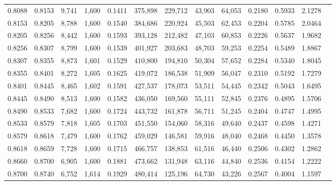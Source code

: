 \begin{tabular}{rrrrrrrrrrrrr}
0.8088 & 0.8153 &  9,741 & 1,600 &                                     0.1411 & 375,898 & 229,712 &  43,903 &  64,053 & 0.2180 & 0.5933 & 2.1278 \\
0.8153 & 0.8205 &  8,788 & 1,600 &                                     0.1540 & 384,686 & 220,924 &  45,503 &  62,453 & 0.2204 & 0.5785 & 2.0464 \\
0.8205 & 0.8256 &  8,442 & 1,600 &                                     0.1593 & 393,128 & 212,482 &  47,103 &  60,853 & 0.2226 & 0.5637 & 1.9682 \\
0.8256 & 0.8307 &  8,799 & 1,600 &                                     0.1539 & 401,927 & 203,683 &  48,703 &  59,253 & 0.2254 & 0.5489 & 1.8867 \\
0.8307 & 0.8355 &  8,873 & 1,601 &                                     0.1529 & 410,800 & 194,810 &  50,304 &  57,652 & 0.2284 & 0.5340 & 1.8045 \\
0.8355 & 0.8401 &  8,272 & 1,605 &                                     0.1625 & 419,072 & 186,538 &  51,909 &  56,047 & 0.2310 & 0.5192 & 1.7279 \\
0.8401 & 0.8445 &  8,465 & 1,602 &                                     0.1591 & 427,537 & 178,073 &  53,511 &  54,445 & 0.2342 & 0.5043 & 1.6495 \\
0.8445 & 0.8490 &  8,513 & 1,600 &                                     0.1582 & 436,050 & 169,560 &  55,111 &  52,845 & 0.2376 & 0.4895 & 1.5706 \\
0.8490 & 0.8533 &  7,682 & 1,600 &                                     0.1724 & 443,732 & 161,878 &  56,711 &  51,245 & 0.2404 & 0.4747 & 1.4995 \\
0.8533 & 0.8579 &  7,818 & 1,605 &                                     0.1703 & 451,550 & 154,060 &  58,316 &  49,640 & 0.2437 & 0.4598 & 1.4271 \\
0.8579 & 0.8618 &  7,479 & 1,600 &                                     0.1762 & 459,029 & 146,581 &  59,916 &  48,040 & 0.2468 & 0.4450 & 1.3578 \\
0.8618 & 0.8659 &  7,728 & 1,600 &                                     0.1715 & 466,757 & 138,853 &  61,516 &  46,440 & 0.2506 & 0.4302 & 1.2862 \\
0.8660 & 0.8700 &  6,905 & 1,600 &                                     0.1881 & 473,662 & 131,948 &  63,116 &  44,840 & 0.2536 & 0.4154 & 1.2222 \\
0.8700 & 0.8740 &  6,752 & 1,614 &                                     0.1929 & 480,414 & 125,196 &  64,730 &  43,226 & 0.2567 & 0.4004 & 1.1597 \\

\end{tabular}
